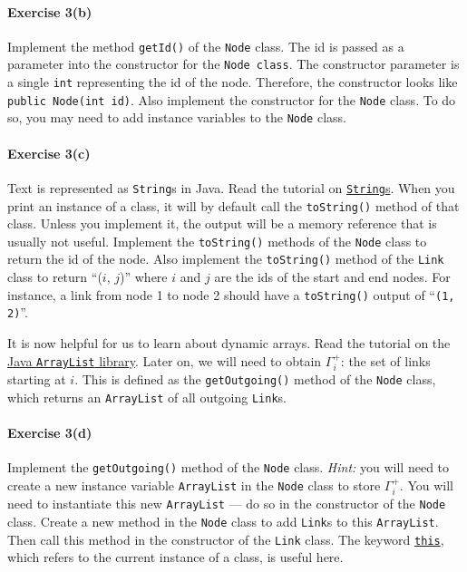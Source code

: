 \documentclass[12pt]{article}
\begin{document}
\paragraph*{Exercise 3(b)} Implement the method \texttt{getId()} of the \texttt{Node} class. 
The id is passed as a parameter into the constructor for the \texttt{Node class}. The constructor parameter is a single \texttt{int} representing the id of the node. Therefore, the constructor looks like \texttt{public Node(int id)}. 
Also implement the constructor for the \texttt{Node} class. To do so, you may need to add instance variables to the \texttt{Node} class.


\paragraph*{Exercise 3(c)}
Text is represented as \texttt{String}s in Java. Read the tutorial on \href{https://www.w3schools.com/java/java_strings.asp}{\texttt{String}s}. 
When you print an instance of a class, it will by default call the \texttt{toString()} method of that class. Unless you implement it, the output will be a memory reference that is usually not useful. Implement the \texttt{toString()} methods of the \texttt{Node} class to return the id of the node. Also implement the \texttt{toString()} method of the \texttt{Link} class to return ``($i$, $j$)'' where $i$ and $j$ are the ids of the start and end nodes. For instance, a link from node 1 to node 2 should have a \texttt{toString()} output of ``\texttt{(1, 2)}''. 
% 

 \vspace{\baselineskip}

\noindent
It is now helpful for us to learn about dynamic arrays. Read the tutorial on the \href{https://www.w3schools.com/java/java_arraylist.asp}{Java \texttt{ArrayList} library}. Later on, we will need to obtain $\Gamma^+_i$: the set of links starting at $i$. This is defined as the \texttt{getOutgoing()} method of the \texttt{Node} class, which returns an \texttt{ArrayList} of all outgoing \texttt{Link}s.

\paragraph*{Exercise 3(d)} Implement the \texttt{getOutgoing()} method of the \texttt{Node} class. \textit{Hint:} you will need to create a new instance variable \texttt{ArrayList} in the \texttt{Node} class to store $\Gamma^+_i$. You will need to instantiate this new \texttt{ArrayList} --- do so in the constructor of the \texttt{Node} class.
Create a new method in the \texttt{Node} class to add \texttt{Link}s to this \texttt{ArrayList}. Then call this method in the constructor of the \texttt{Link} class. The keyword \href{https://www.w3schools.com/java/ref_keyword_this.asp}{\texttt{this}}, which refers to the current instance of a class, is useful here. 
\end{document}
